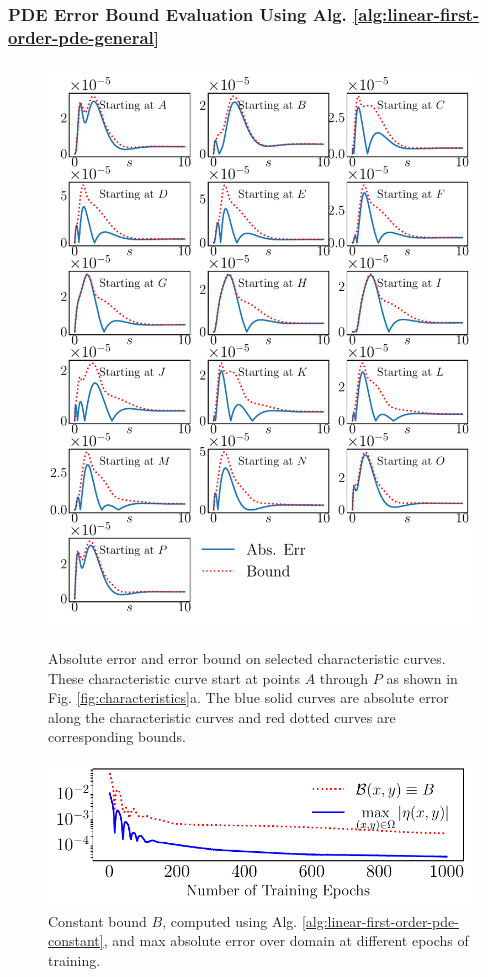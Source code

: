 \documentclass[accepted]{uai2023}
\begin{document}
\subsubsection{PDE Error Bound Evaluation Using Alg. \ref{alg:linear-first-order-pde-general}}
    \begin{figure}[!htp]
        \centering
        \includegraphics[width=\linewidth]{assets/pde-error-bound.pdf}
        \caption{
            \small
            Absolute error and error bound on selected characteristic curves. 
            These characteristic curve start at points $A$ through $P$ as shown in Fig. \ref{fig:characteristics}a.
            The blue solid curves are absolute error along the characteristic curves and red dotted curves are corresponding bounds.
        }\label{fig:pde-error-bound}
        \includegraphics[width=\linewidth]{assets/pde-constant-bound.pdf}
        \caption{
            \small
            Constant bound $B$, computed using Alg. \ref{alg:linear-first-order-pde-constant}, and max absolute error over domain at different epochs of training.
        }\label{fig:pde-constant-bound}
    \end{figure}
\end{document}
